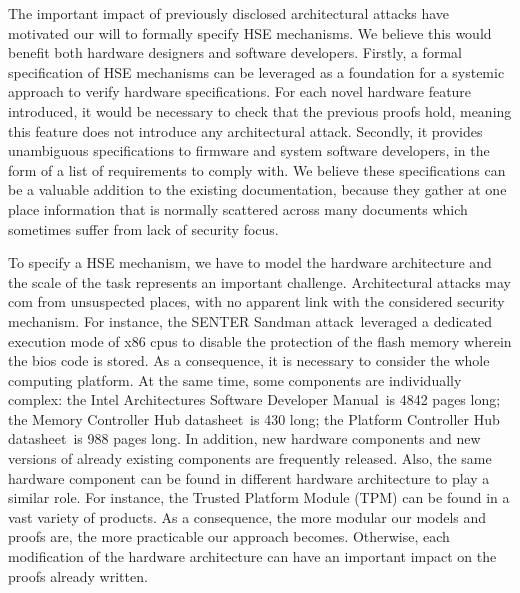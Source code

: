 The important impact of previously disclosed architectural attacks have
motivated our will to formally specify HSE mechanisms.
%
We believe this would benefit both hardware designers and software developers.
%
Firstly, a formal specification of HSE mechanisms can be leveraged as a
foundation for a systemic approach to verify hardware specifications.
%
For each novel hardware feature introduced, it would be necessary to check that
the previous proofs hold, meaning this feature does not introduce any
architectural attack.
%
Secondly, it provides unambiguous specifications to firmware and system software
developers, in the form of a list of requirements to comply with.
%
We believe these specifications can be a valuable addition to the existing
documentation, because they gather at one place information that is normally
scattered across many documents which sometimes suffer from lack of security
focus.

To specify a HSE mechanism, we have to model the hardware architecture and the
scale of the task represents an important challenge.
%
Architectural attacks may com from unsuspected places, with no apparent link
with the considered security mechanism.
%
For instance, the SENTER Sandman attack\,\cite{kovah2015senter} leveraged a
dedicated execution mode of x86 \acp{cpu} to disable the protection of the flash
memory wherein the \ac{bios} code is stored.
%
As a consequence, it is necessary to consider the whole computing platform.
%
At the same time, some components are individually complex:
%
the Intel Architectures Software Developer Manual\,\cite{intel2014manual} is
4842 pages long;
%
the Memory Controller Hub datasheet\,\cite{intel2009mch} is 430 long;
%
the Platform Controller Hub datasheet\,\cite{intel2012pch} is 988 pages long.
%
In addition, new hardware components and new versions of already existing
components are frequently released.
%
Also, the same
hardware component can be found in different hardware architecture to play a
similar role.
%
For instance, the Trusted Platform Module (TPM) can be found in a vast variety
of products.
%
As a consequence, the more modular our models and proofs are, the more
practicable our approach becomes.
%
Otherwise, each modification of the hardware architecture can have an important
impact on the proofs already written.

